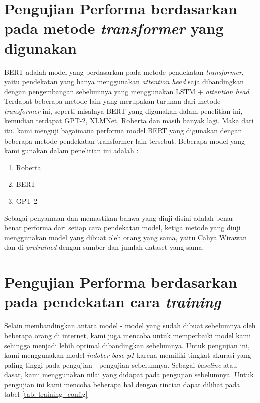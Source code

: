 \section{Pengujian Performa berdasarkan pada metode \textit{transformer} yang digunakan}

BERT adalah model yang berdasarkan pada metode pendekatan \textit{transformer}, yaitu pendekatan yang hanya menggunakan \textit{attention head} saja dibandingkan dengan pengembangan sebelumnya yang menggunakan LSTM + \textit{attention head}. Terdapat beberapa metode lain yang merupakan turunan dari metode \textit{transformer} ini, seperti misalnya BERT yang digunakan dalam penelitian ini, kemudian terdapat GPT-2, XLMNet, Roberta dan masih banyak lagi. Maka dari itu, kami menguji bagaimana performa model BERT yang digunakan dengan beberapa metode pendekatan transformer lain tersebut. Beberapa model yang kami gunakan dalam penelitian ini adalah :

\begin{enumerate}[nolistsep]
    \item Roberta
    \item BERT
    \item GPT-2
\end{enumerate}

Sebagai penyamaan dan memastikan bahwa yang diuji disini adalah benar - benar performa dari setiap cara pendekatan model, ketiga metode yang diuji menggunakan model yang dibuat oleh orang yang sama, yaitu Cahya Wirawan dan di-\textit{pretrained} dengan sumber dan jumlah dataset yang sama.

\section{Pengujian Performa berdasarkan pada pendekatan cara \textit{training}}

Selain membandingkan antara model - model yang sudah dibuat sebelumnya oleh beberapa orang di internet, kami juga mencoba untuk memperbaiki model kami sehingga menjadi lebih optimal dibandingkan sebelumnya. Untuk pengujian ini, kami menggunakan model \textit{indober-base-p1}  karena memiliki tingkat akurasi yang paling tinggi pada pengujian - pengujian sebelumnya. Sebagai \textit{baseline} atau dasar, kami menggunakan nilai yang didapat pada pengujian sebelumnya. Untuk pengujian ini kami mencoba beberapa hal dengan rincian dapat dilihat pada tabel \ref{tab: training_config}

